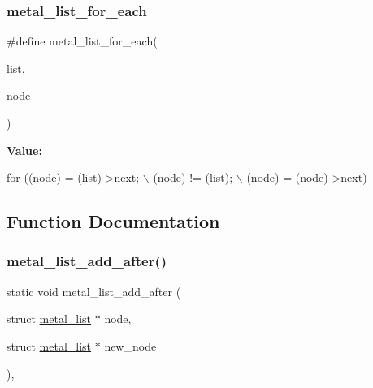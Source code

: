\mbox{\label{group__list_ga84a435a63bab936c3d3f82611e4d9723}} 
\subsubsection{\texorpdfstring{metal\+\_\+list\+\_\+for\+\_\+each}{metal\_list\_for\_each}}
{\footnotesize\ttfamily \#define metal\+\_\+list\+\_\+for\+\_\+each(\begin{DoxyParamCaption}\item[{}]{list,  }\item[{}]{node }\end{DoxyParamCaption})}

{\bfseries Value\+:}
\begin{DoxyCode}
\textcolor{keywordflow}{for} ((\hyperlink{structmetal__irq__controller_a26e87c0da6978319075db2289b901749}{node}) = (list)->next;         \(\backslash\)
             (\hyperlink{structmetal__irq__controller_a26e87c0da6978319075db2289b901749}{node}) != (list);                      \(\backslash\)
             (\hyperlink{structmetal__irq__controller_a26e87c0da6978319075db2289b901749}{node}) = (\hyperlink{structmetal__irq__controller_a26e87c0da6978319075db2289b901749}{node})->next)
\end{DoxyCode}


\subsection{Function Documentation}
\mbox{\label{group__list_ga1262a3c4164fe487f3cdbebbcbf54aa2}} 
\subsubsection{\texorpdfstring{metal\+\_\+list\+\_\+add\+\_\+after()}{metal\_list\_add\_after()}}
{\footnotesize\ttfamily static void metal\+\_\+list\+\_\+add\+\_\+after (\begin{DoxyParamCaption}\item[{struct \hyperlink{structmetal__list}{metal\+\_\+list} $\ast$}]{node,  }\item[{struct \hyperlink{structmetal__list}{metal\+\_\+list} $\ast$}]{new\+\_\+node }\end{DoxyParamCaption})\hspace{0.3cm}{\ttfamily [inline]}, {\ttfamily [static]}}

